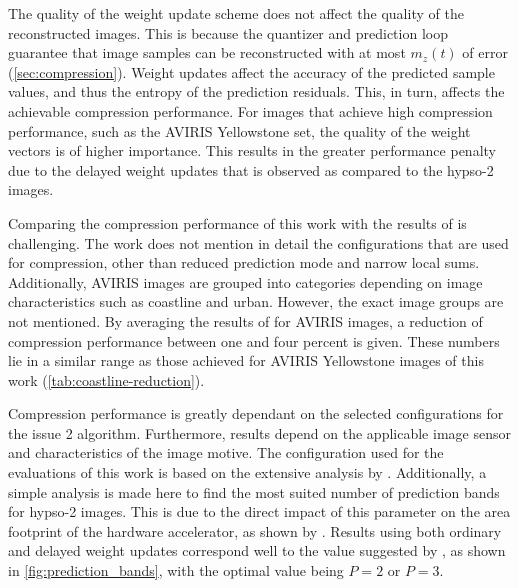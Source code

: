 The quality of the weight update scheme does not affect the quality of the reconstructed images. This is because the quantizer and prediction loop guarantee that image samples can be reconstructed with at most $m_z(t)$ of error (\autoref{sec:compression}). Weight updates affect the accuracy of the predicted sample values, and thus the entropy of the prediction residuals. This, in turn, affects the achievable compression performance. For images that achieve high compression performance, such as the AVIRIS Yellowstone set, the quality of the weight vectors is of higher importance. This results in the greater performance penalty due to the delayed weight updates that is observed as compared to the \acrshort{hypso}-2 images.

Comparing the compression performance of this work with the results of \citeauthor{jiaRemovalFeedbackLoop2025} is challenging. The work does not mention in detail the configurations that are used for compression, other than reduced prediction mode and narrow local sums. Additionally, AVIRIS images are grouped into categories depending on image characteristics such as coastline and urban. However, the exact image groups are not mentioned. By averaging the results of \citeauthor{jiaRemovalFeedbackLoop2025} for AVIRIS images, a reduction of compression performance between one and four percent is given. These numbers lie in a similar range as those achieved for AVIRIS Yellowstone images of this work (\autoref{tab:coastline-reduction}).

Compression performance is greatly dependant on the selected configurations for the issue 2 algorithm. Furthermore, results depend on the applicable image sensor and characteristics of the image motive. The configuration used for the evaluations of this work is based on the extensive analysis by \citeauthor{blanesPerformanceImpactParameter2019} \cite{blanesPerformanceImpactParameter2019}. Additionally, a simple analysis is made here to find the most suited number of prediction bands for \acrshort{hypso}-2 images. This is due to the direct impact of this parameter on the area footprint of the hardware accelerator, as shown by \citeauthor{vorhaugHyperspectralImageCompression2024} \cite{vorhaugHyperspectralImageCompression2024}. Results using both ordinary and delayed weight updates correspond well to the value suggested by \citeauthor{blanesPerformanceImpactParameter2019}, as shown in \autoref{fig:prediction_bands}, with the optimal value being $P=2$ or $P=3$.

